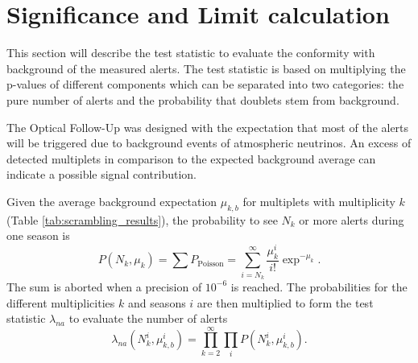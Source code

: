 \newpage
\section{Significance and Limit calculation}
\label{sec:limits}
This 
section will describe the test statistic to evaluate the conformity with 
background of the measured alerts.
The test statistic is based on multiplying the p-values of different 
components which can be separated into two categories: the pure number of 
alerts and the probability that doublets stem from background.

The Optical Follow-Up was designed with the expectation that most of the alerts 
will be triggered due to background events of atmospheric neutrinos. An excess 
of detected multiplets in comparison to the expected background 
average can indicate a possible signal contribution. 

Given the average 
background expectation 
 $\mu_{k,b}$ for multiplets with 
multiplicity $k$ (Table \ref{tab:scrambling_results}), the probability to see 
$N_k$ or more alerts during one 
season is
\begin{equation} 
 P(N_k, \mu_k) = \sum P_\text{Poisson} = \sum_{i=N_k}^\infty 
\frac{\mu_k^i}{i!}\exp^{-\mu_k}.
\end{equation}
The sum is aborted when a precision of $10^{-6}$ is reached.
The probabilities for the different multiplicities $k$ and seasons $i$ are then 
multiplied to form the test statistic $\lambda_{na}$ to evaluate the number of 
alerts
\begin{equation}
\label{eq:test_statistic}
 \lambda_{na} \left(N_k^i, \mu_{k,b}^i \right) = \prod_{k=2}^\infty \prod_i 
P(N_k^i, 
\mu_{k,b}^i).
\end{equation}

